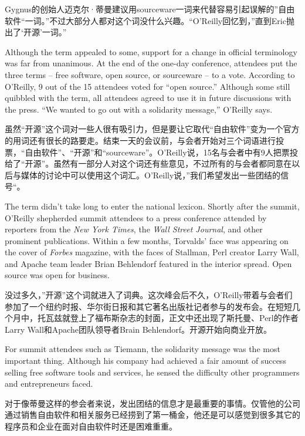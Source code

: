 \ifdefined\chs
Gygnus的创始人迈克尔·蒂曼建议用sourceware一词来代替容易引起误解的”自由软件“一词。”不过大部分人都对这个词没什么兴趣。“O'Reilly回忆到，”直到Eric抛出了‘开源’一词。”
\fi

\ifdefined\eng
Although the term appealed to some, support for a change in official terminology was far from unanimous. At the end of the one-day conference, attendees put the three terms -- free software, open source, or sourceware -- to a vote. According to O'Reilly, 9 out of the 15 attendees voted for ``open source.'' Although some still quibbled with the term, all attendees agreed to use it in future discussions with the press. ``We wanted to go out with a solidarity message,'' O'Reilly says.
\fi

\ifdefined\chs
虽然“开源”这个词对一些人很有吸引力，但是要让它取代“自由软件”变为一个官方的用词还有很长的路要走。结束一天的会议前，与会者开始对三个词语进行投票，“自由软件”、“开源”和“sourceware”。O'Reilly说，15名与会者中有9人把票投给了“开源”。虽然有一部分人对这个词还有些意见，不过所有的与会者都同意在以后与媒体的讨论中可以使用这个词汇。O'Reilly说，”我们希望发出一些团结的信号“。
\fi

\ifdefined\eng
The term didn't take long to enter the national lexicon. Shortly after the summit, O'Reilly shepherded summit attendees to a press conference attended by reporters from the \textit{New York Times}, the \textit{Wall Street Journal}, and other prominent publications. Within a few months, Torvalds' face was appearing on the cover of \textit{Forbes} magazine, with the faces of Stallman, Perl creator Larry Wall, and Apache team leader Brian Behlendorf featured in the interior spread. Open source was open for business.
\fi

\ifdefined\chs
没过多久，”开源”这个词就进入了词典。这次峰会后不久，O'Reilly带着与会者们参加了一个纽约时报、华尔街日报和其它著名出版社记者参与的发布会。在短短几个月中，托瓦兹就登上了福布斯杂志的封面，正文中还出现了斯托曼、Perl的作者Larry Wall和Apache团队领导者Brain Behlendorf。开源开始向商业开放。
\fi

\ifdefined\eng
For summit attendees such as Tiemann, the solidarity message was the most important thing. Although his company had achieved a fair amount of success selling free software tools and services, he sensed the difficulty other programmers and entrepreneurs faced.
\fi

\ifdefined\chs
对于像蒂曼这样的参会者来说，发出团结的信息才是最重要的事情。仅管他的公司通过销售自由软件和相关服务已经捞到了第一桶金，他还是可以感觉到很多其它的程序员和企业在面对自由软件时还是困难重重。
\fi


